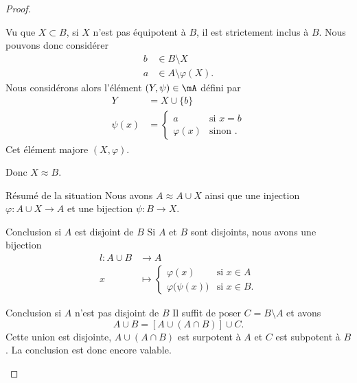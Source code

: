 \begin{proof}
\begin{subproof}
            Vu que \( X\subset B\), si \( X\) n'est pas équipotent à \( B\), il est strictement inclus à \( B\). Nous pouvons donc considérer
            \begin{subequations}
                \begin{align}
                    b&\in B\setminus X\\
                    a&\in A\setminus \varphi(X).
                \end{align}
            \end{subequations}
            Nous considérons alors l'élément \( (Y,\psi)\in \mA\) défini par
            \begin{subequations}
                \begin{align}
                    Y&=X\cup\{ b \}\\
                    \psi(x)&=\begin{cases}
                        a    &   \text{si } x=b\\
                        \varphi(x)    &    \text{sinon }.
                    \end{cases}
                \end{align}
            \end{subequations}
            Cet élément majore \( (X,\varphi)\).

            Donc \( X\approx B\).
        \item[Résumé de la situation]
            Nous avons \( A\approx A\cup X\) ainsi que une injection \( \varphi\colon A\cup X\to A\) et une bijection \( \psi\colon B\to X\).
        \item[Conclusion si \( A\) est disjoint de \( B\)]
            Si \( A\) et \( B\) sont disjoints, nous avons une bijection
            \begin{equation}
                \begin{aligned}
                    l\colon A\cup B&\to A \\
                    x&\mapsto \begin{cases}
                        \varphi(x)    &   \text{si }  x\in A\\
                        \varphi\big( \psi(x) \big)    &    \text{si } x\in B.
                    \end{cases}
                \end{aligned}
            \end{equation}
        \item[Conclusion si \( A\) n'est pas disjoint de \( B\)]
            Il suffit de poser \( C=B\setminus A\) et avons
            \begin{equation}
                A\cup B=[A\cup (A\cap B)]\cup C.
            \end{equation}
            Cette union est disjointe, \( A\cup(A\cap B)\) est surpotent à \( A\) et \( C\) est subpotent à $B$. La conclusion est donc encore valable.
    \end{subproof}
\end{proof}

